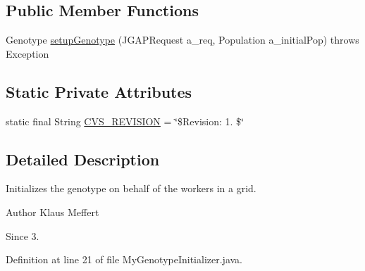 \subsection*{Public Member Functions}
\begin{DoxyCompactItemize}
\item 
Genotype \hyperlink{classexamples_1_1grid_1_1evolution_distributed_1_1_my_genotype_initializer_a7b97f03cbd6248efec126b6579a993a0}{setup\-Genotype} (J\-G\-A\-P\-Request a\-\_\-req, Population a\-\_\-initial\-Pop)  throws Exception 
\end{DoxyCompactItemize}
\subsection*{Static Private Attributes}
\begin{DoxyCompactItemize}
\item 
static final String \hyperlink{classexamples_1_1grid_1_1evolution_distributed_1_1_my_genotype_initializer_a1c970dfabebb5656e3ee772ede756966}{C\-V\-S\-\_\-\-R\-E\-V\-I\-S\-I\-O\-N} = \char`\"{}\$Revision\-: 1. \$\char`\"{}
\end{DoxyCompactItemize}


\subsection{Detailed Description}
Initializes the genotype on behalf of the workers in a grid.

\begin{DoxyAuthor}{Author}
Klaus Meffert 
\end{DoxyAuthor}
\begin{DoxySince}{Since}
3. 
\end{DoxySince}


Definition at line 21 of file My\-Genotype\-Initializer.\-java.



